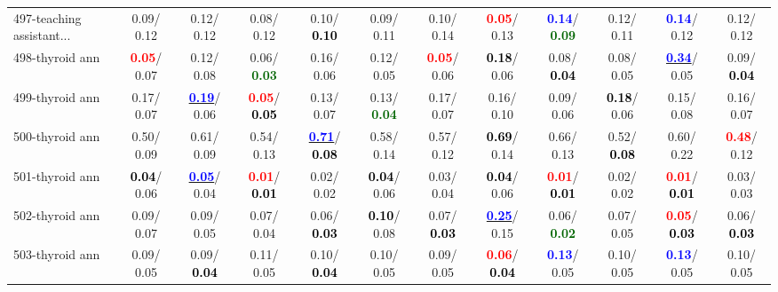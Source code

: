 \begin{table}[h]
\begin{center}
{\begin{tabular}{lc|c|c|c|c|c|c|c|c|c|c}
497-teaching assistant... &   0.09/  0.12 &   0.12/  0.12 &   0.08/  0.12 &   0.10/\textcolor{black}{\textbf{  0.10}} &   0.09/  0.11 &   0.10/  0.14 & \textcolor{red}{\textbf{  0.05}}/  0.13 & \textcolor{blue}{\textbf{  0.14}}/\textcolor{darkgreen}{\textbf{  0.09}} &   0.12/  0.11 & \textcolor{blue}{\textbf{  0.14}}/  0.12 &   0.12/  0.12 \\
498-thyroid ann & \textcolor{red}{\textbf{  0.05}}/  0.07 &   0.12/  0.08 &   0.06/\textcolor{darkgreen}{\textbf{  0.03}} &   0.16/  0.06 &   0.12/  0.05 & \textcolor{red}{\textbf{  0.05}}/  0.06 & \textcolor{black}{\textbf{  0.18}}/  0.06 &   0.08/\textcolor{black}{\textbf{  0.04}} &   0.08/  0.05 & \underline{\textcolor{blue}{\textbf{  0.34}}}/  0.05 &   0.09/\textcolor{black}{\textbf{  0.04}} \\
499-thyroid ann &   0.17/  0.07 & \underline{\textcolor{blue}{\textbf{  0.19}}}/  0.06 & \textcolor{red}{\textbf{  0.05}}/\textcolor{black}{\textbf{  0.05}} &   0.13/  0.07 &   0.13/\textcolor{darkgreen}{\textbf{  0.04}} &   0.17/  0.07 &   0.16/  0.10 &   0.09/  0.06 & \textcolor{black}{\textbf{  0.18}}/  0.06 &   0.15/  0.08 &   0.16/  0.07 \\
500-thyroid ann &   0.50/  0.09 &   0.61/  0.09 &   0.54/  0.13 & \underline{\textcolor{blue}{\textbf{  0.71}}}/\textcolor{black}{\textbf{  0.08}} &   0.58/  0.14 &   0.57/  0.12 & \textcolor{black}{\textbf{  0.69}}/  0.14 &   0.66/  0.13 &   0.52/\textcolor{black}{\textbf{  0.08}} &   0.60/  0.22 & \textcolor{red}{\textbf{  0.48}}/  0.12 \\
501-thyroid ann & \textcolor{black}{\textbf{  0.04}}/  0.06 & \underline{\textcolor{blue}{\textbf{  0.05}}}/  0.04 & \textcolor{red}{\textbf{  0.01}}/\textcolor{black}{\textbf{  0.01}} &   0.02/  0.02 & \textcolor{black}{\textbf{  0.04}}/  0.06 &   0.03/  0.04 & \textcolor{black}{\textbf{  0.04}}/  0.06 & \textcolor{red}{\textbf{  0.01}}/\textcolor{black}{\textbf{  0.01}} &   0.02/  0.02 & \textcolor{red}{\textbf{  0.01}}/\textcolor{black}{\textbf{  0.01}} &   0.03/  0.03 \\ \hline
502-thyroid ann &   0.09/  0.07 &   0.09/  0.05 &   0.07/  0.04 &   0.06/\textcolor{black}{\textbf{  0.03}} & \textcolor{black}{\textbf{  0.10}}/  0.08 &   0.07/\textcolor{black}{\textbf{  0.03}} & \underline{\textcolor{blue}{\textbf{  0.25}}}/  0.15 &   0.06/\textcolor{darkgreen}{\textbf{  0.02}} &   0.07/  0.05 & \textcolor{red}{\textbf{  0.05}}/\textcolor{black}{\textbf{  0.03}} &   0.06/\textcolor{black}{\textbf{  0.03}} \\
503-thyroid ann &   0.09/  0.05 &   0.09/\textcolor{black}{\textbf{  0.04}} &   0.11/  0.05 &   0.10/\textcolor{black}{\textbf{  0.04}} &   0.10/  0.05 &   0.09/  0.05 & \textcolor{red}{\textbf{  0.06}}/\textcolor{black}{\textbf{  0.04}} & \textcolor{blue}{\textbf{  0.13}}/  0.05 &   0.10/  0.05 & \textcolor{blue}{\textbf{  0.13}}/  0.05 &   0.10/  0.05 \\

\end{tabular}}
\end{center}
\end{table}
